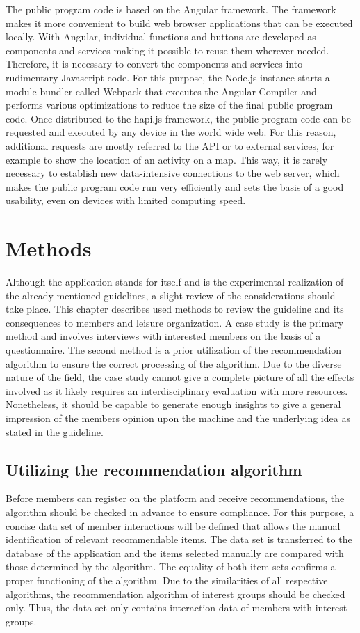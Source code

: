 \documentclass[12pt,numbers=noenddot,parskip,bibliography=totocnumbered,listof=totocnumbered,draft]{scrreprt}
\begin{document}
The public program code is based on the \mbox{Angular} \citep{angular} framework. The framework makes it more convenient to build web browser applications that can be executed locally. With \mbox{Angular}, individual functions and buttons are developed as components and services making it possible to reuse them wherever needed. Therefore, it is necessary to convert the components and services into rudimentary \mbox{Javascript} code. For this purpose, the \mbox{Node.js} instance starts a module bundler called \mbox{Webpack} \citep{webpack} that executes the \mbox{Angular}-Compiler and performs various optimizations to reduce the size of the final public program code. Once distributed to the \mbox{hapi.js} framework, the public program code can be requested and executed by any device in the world wide web. For this reason, additional requests are mostly referred to the API or to external services, for example to show the location of an activity on a map. This way, it is rarely necessary to establish new data-intensive connections to the web server, which makes the public program code run very efficiently and sets the basis of a good usability, even on devices with limited computing speed.

\chapter{Methods}
Although the application stands for itself and is the experimental realization of the already mentioned guidelines, a slight review of the considerations should take place. This chapter describes used methods to review the guideline and its consequences to members and leisure organization. A case study is the primary method and involves interviews with interested members on the basis of a questionnaire. The second method is a prior utilization of the recommendation algorithm to ensure the correct processing of the algorithm. Due to the diverse nature of the field, the case study cannot give a complete picture of all the effects involved as it likely requires an interdisciplinary evaluation with more resources. Nonetheless, it should be capable to generate enough insights to give a general impression of the members opinion upon the machine and the underlying idea as stated in the guideline.

\section{Utilizing the recommendation algorithm}
Before members can register on the platform and receive recommendations, the algorithm should be checked in advance to ensure compliance. For this purpose, a concise data set of member interactions will be defined that allows the manual identification of relevant recommendable items. The data set is transferred to the database of the application and the items selected manually are compared with those determined by the algorithm. The equality of both item sets confirms a proper functioning of the algorithm. Due to the similarities of all respective algorithms, the recommendation algorithm of interest groups should be checked only. Thus, the data set only contains interaction data of members with interest groups.
\end{document}
